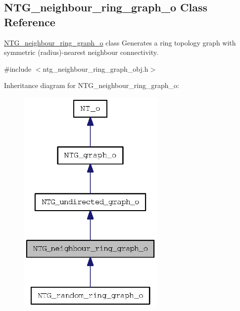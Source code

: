 \subsection{NTG\_\-neighbour\_\-ring\_\-graph\_\-o Class Reference}
\label{class_n_t_g__neighbour__ring__graph__o}


\hyperlink{class_n_t_g__neighbour__ring__graph__o}{NTG\_\-neighbour\_\-ring\_\-graph\_\-o} class Generates a ring topology graph with symmetric (radius)-\/nearest neighbour connectivity.  




{\ttfamily \#include $<$ntg\_\-neighbour\_\-ring\_\-graph\_\-obj.h$>$}



Inheritance diagram for NTG\_\-neighbour\_\-ring\_\-graph\_\-o:
\nopagebreak
\begin{figure}[H]
\begin{center}
\leavevmode
\includegraphics[width=202pt]{class_n_t_g__neighbour__ring__graph__o__inherit__graph}
\end{center}
\end{figure}


